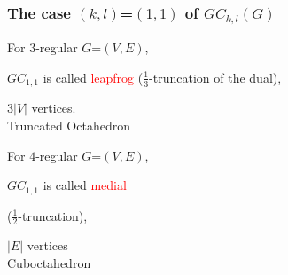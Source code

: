 \documentclass{beamer}
\begin{document}
\begin{frame}\frametitle{The case $(k,l)$=$(1,1)$ of $GC_{k,l}(G)$}

\begin{center}
\begin{minipage}{4.6cm}
\centering
{}\par
For $3$-regular $G$=$(V,E)$, \par
$GC_{1,1}$ is called \textcolor{red}{leapfrog}
($\frac{1}{3}$-truncation of the dual),\par
$3|V|$ vertices.\\
Truncated Octahedron
\end{minipage}
\begin{minipage}{4.6cm}
\centering
{}\par
\vspace{0.6cm} 
For  $4$-regular $G$=$(V,E)$, \par
$GC_{1,1}$ is called \textcolor{red}{medial}\par
($\frac{1}{2}$-truncation),\par
$|E|$ vertices\\
 Cuboctahedron
\end{minipage} 
\end{center} 

\end{frame}
\end{document}
